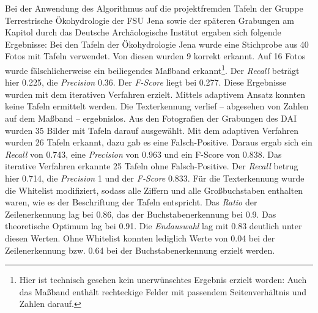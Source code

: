Bei der Anwendung des Algorithmus auf die projektfremden Tafeln der Gruppe Terrestrische Ökohydrologie der FSU Jena sowie der späteren Grabungen am Kapitol durch das Deutsche Archäologische Institut ergaben sich folgende Ergebnisse:
Bei den Tafeln der Ökohydrologie Jena wurde eine Stichprobe aus 40 Fotos mit Tafeln verwendet. Von diesen wurden 9 korrekt erkannt. Auf 16 Fotos wurde fälschlicherweise ein beiliegendes Maßband erkannt\footnote{Hier ist technisch gesehen kein unerwünschtes Ergebnis erzielt worden: Auch das Maßband enthält rechteckige Felder mit passendem Seitenverhältnis und Zahlen darauf.}. Der \textit{Recall} beträgt hier 0.225, die \textit{Precision} 0.36. Der \textit{F-Score} liegt bei 0.277. Diese Ergebnisse wurden mit dem iterativen Verfahren erzielt. Mittels adaptivem Ansatz konnten keine Tafeln ermittelt werden. Die Texterkennung verlief -- abgesehen von Zahlen auf dem Maßband -- ergebnislos.
Aus den Fotografien der Grabungen des DAI wurden 35 Bilder mit Tafeln darauf ausgewählt. Mit dem adaptiven Verfahren wurden 26 Tafeln erkannt, dazu gab es eine Falsch-Positive. Daraus ergab sich ein \textit{Recall} von 0.743, eine \textit{Precision} von 0.963 und ein {F-Score} von 0.838. Das iterative Verfahren erkannte 25 Tafeln ohne Falsch-Positive. Der \textit{Recall} betrug hier 0.714, die \textit{Precision} 1 und der \textit{F-Score} 0.833.
Für die Texterkennung wurde die Whitelist modifiziert, sodass alle Ziffern und alle Großbuchstaben enthalten waren, wie es der Beschriftung der Tafeln entspricht. Das \textit{Ratio} der Zeilenerkennung lag bei 0.86, das der Buchstabenerkennung bei 0.9. Das theoretische Optimum lag bei 0.91. Die \textit{Endauswahl} lag mit 0.83 deutlich unter diesen Werten. Ohne Whitelist konnten lediglich Werte von 0.04 bei der Zeilenerkennung bzw. 0.64 bei der Buchstabenerkennung erzielt werden.
